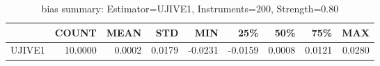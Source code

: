 \begin{table}[ht]
\centering
\caption{bias summary: Estimator=UJIVE1, Instruments=200, Strength=0.80}
\begin{tabular}{lrrrrrrrr}
\toprule
 & COUNT & MEAN & STD & MIN & 25\% & 50\% & 75\% & MAX \\
\midrule
UJIVE1 & 10.0000 & 0.0002 & 0.0179 & -0.0231 & -0.0159 & 0.0008 & 0.0121 & 0.0280 \\
\bottomrule
\end{tabular}
\end{table}
